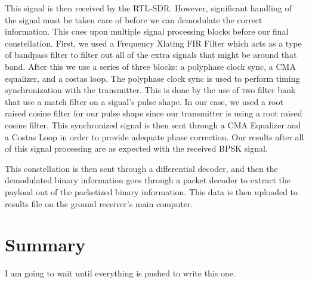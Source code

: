 This signal is then received by the RTL-SDR.  However, significant handling of the signal must be taken care of before we can demodulate the correct information. This cues upon multiple signal processing blocks before our final constellation. First, we used a Frequency Xlating FIR Filter which acts as a type of bandpass filter to filter out all of the extra signals that might be around that band.  After this we use a series of three blocks: a polyphase clock sync, a CMA equalizer, and a costas loop.  The polyphase clock sync is used to perform timing synchronization with the transmitter.  This is done by the use of two filter bank that use a match filter on a signal’s pulse shape.  In our case, we used a root raised cosine filter for our pulse shape since our transmitter is using a root raised cosine filter.  This synchronized signal is then sent through a CMA Equalizer and a Costas Loop in order to provide adequate phase correction.  Our results after all of this signal processing are as expected with the received BPSK signal. 

This constellation is then sent through a differential decoder, and then the demodulated binary information goes through a packet decoder to extract the payload out of the packetized binary information. This data is then uploaded to results file on the ground receiver’s main computer.

\section{Summary}
I am going to wait until everything is pushed to write this one.
